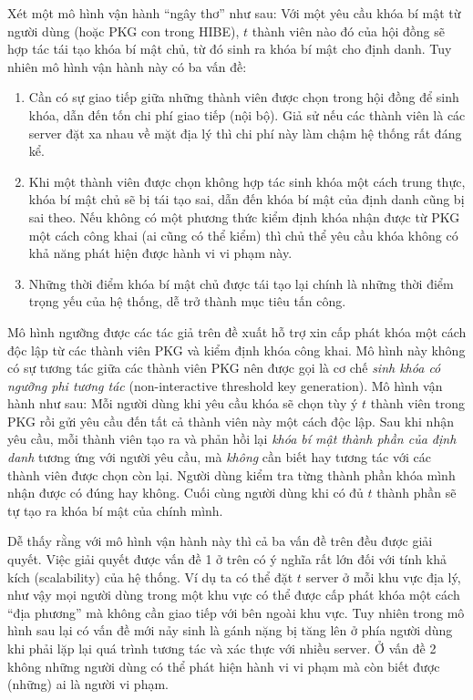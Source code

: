 \documentclass[class=report, crop=false]{standalone}
\begin{document}
			Xét một mô hình vận hành ``ngây thơ'' như sau: Với một yêu cầu khóa bí mật từ người dùng (hoặc PKG con trong HIBE), $t$ thành viên nào đó của hội đồng sẽ hợp tác tái tạo khóa bí mật chủ, từ đó sinh ra khóa bí mật cho định danh. Tuy nhiên mô hình vận hành này có ba vấn đề:
			\vspace{-0.5cm}
			\begin{enumerate}
				\item Cần có sự giao tiếp giữa những thành viên được chọn trong hội đồng để sinh khóa, dẫn đến tốn chi phí giao tiếp (nội bộ). Giả sử nếu các thành viên là các server đặt xa nhau về mặt địa lý thì chi phí này làm chậm hệ thống rất đáng kể.
				\item Khi một thành viên được chọn không hợp tác sinh khóa một cách trung thực, khóa bí mật chủ sẽ bị tái tạo sai, dẫn đến khóa bí mật của định danh cũng bị sai theo. Nếu không có một phương thức kiểm định khóa nhận được từ PKG một cách công khai (ai cũng có thể kiểm) thì chủ thể yêu cầu khóa không có khả năng phát hiện được hành vi vi phạm này.
				\item Những thời điểm khóa bí mật chủ được tái tạo lại chính là những thời điểm trọng yếu của hệ thống, dễ trở thành mục tiêu tấn công.
			\end{enumerate}
			
			Mô hình ngưỡng được các tác giả trên đề xuất hỗ trợ xin cấp phát khóa một cách độc lập từ các thành viên PKG và kiểm định khóa công khai. Mô hình này không có sự tương tác giữa các thành viên PKG nên được gọi là cơ chế \textit{sinh khóa có ngưỡng phi tương tác} (non-interactive threshold key generation). Mô hình vận hành như sau: Mỗi người dùng khi yêu cầu khóa sẽ chọn tùy ý $t$ thành viên trong PKG rồi gửi yêu cầu đến tất cả thành viên này một cách độc lập. Sau khi nhận yêu cầu, mỗi thành viên tạo ra và phản hồi lại \textit{khóa bí mật thành phần của định danh} tương ứng với người yêu cầu, mà \emph{không} cần biết hay tương tác với các thành viên được chọn còn lại. Người dùng kiểm tra từng thành phần khóa mình nhận được có đúng hay không. Cuối cùng người dùng khi có đủ $t$ thành phần sẽ tự tạo ra khóa bí mật của chính mình.
			
			Dễ thấy rằng với mô hình vận hành này thì cả ba vấn đề trên đều được giải quyết. Việc giải quyết được vấn đề 1 ở trên có ý nghĩa rất lớn đối với tính khả kích (scalability) của hệ thống. Ví dụ ta có thể đặt $t$ server ở mỗi khu vực địa lý, như vậy mọi người dùng trong một khu vực có thể được cấp phát khóa một cách ``địa phương'' mà không cần giao tiếp với bên ngoài khu vực. Tuy nhiên trong mô hình sau lại có vấn đề mới nảy sinh là gánh nặng bị tăng lên ở phía người dùng khi phải lặp lại quá trình tương tác và xác thực với nhiều server. Ở vấn đề 2 không những người dùng có thể phát hiện hành vi vi phạm mà còn biết được (những) ai là người vi phạm.
\end{document}
